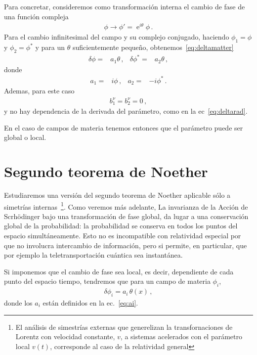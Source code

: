 Para concretar, consideremos como transformación interna el cambio de fase de una función compleja
\begin{align}
  \phi\to \phi'=\operatorname{e}^{i\theta}\phi\,.
\end{align}
Para el cambio infinitesimal del campo y su complejo conjugado,  haciendo $\phi_1=\phi$ y $\phi_2=\phi^{*}$ y
para un $\theta$ suficientemente pequeño, obtenemos~\eqref{eq:deltamatter}
\begin{align}
  \delta\phi=&a_1 \theta\,, &  \delta\phi^{*}=&  a_2 \theta\,, 
\end{align}
donde
\begin{align}
  \label{eq:ai}
  a_1=& i\phi \,, & a_2=&-i\phi^{*}\,.
\end{align}
Ademas, para este caso
\begin{align}
  b_1^\nu=b_2^\nu=0\,,
\end{align}
y no hay dependencia de la derivada del parámetro, como en la ec~\eqref{eq:deltarad}.

En el caso de campos de materia tenemos entonces 
que el parámetro puede ser global o local.

\section{Segundo teorema de Noether}

Estudiaremos  una versión del segundo teorema de Noether aplicable sólo a simetrías internas~\footnote{El análisis de simestrías externas que generelizan la transfornaciones de Lorentz con velocidad constante, $v$, a sistemas acelerados con el parámetro local $v(t)$, corresponde al caso de la relatividad general}. Como veremos más adelante, La invarianza de la Acción de Scrhödinger bajo una transformación de fase global, da lugar a una conservación global de la probabilidad: la probabilidad se conserva en todos los puntos del espacio simultáneamente. Esto no es incompatible con relatividad especial por que no involucra intercambio de información, pero si permite, en particular, que por ejemplo la teletransportación cuántica sea instantánea.

Si imponemos que el cambio de fase sea local, es decir, dependiente de cada punto  del espacio tiempo, tendremos que para un campo de materia $\phi_{i}$, 
\begin{align}
  \delta\phi_i=a_i\,\theta(x)\,,
\end{align}
donde los $a_i$ están definidos en la ec.~\eqref{eq:ai}.

